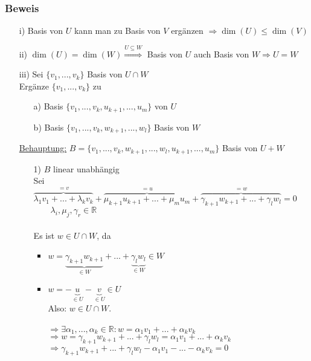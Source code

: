 \documentclass[12pt,titlepage, pdf]{article}
\newcommand{\R}{\mathds{R}}
\newcommand{\uline}[1]{\underline{#1}}
\renewcommand{\>}{\rightarrow}
\renewcommand{\*}{\cdot}
\begin{document}
	\subsubsection*{Beweis}
	\begin{itemize}
		\item[i)] Basis von $U$ kann man zu Basis von $V$ ergänzen $\Rightarrow \dim(U) \leq \dim(V)$
		\item[ii)] $\dim(U)= \dim(W) \overset{U\subseteq W}{\Rightarrow}$ Basis von $U$ auch Basis von $W \Rightarrow U = W$
		\item[iii)] Sei $\{v_1,...,v_k\}$ Basis von $U \cap W$ \\
		Ergänze $\{v_1,...,v_k\}$ zu 
		\begin{itemize}
			\item[a)] Basis $\{v_1,...,v_k, u_{k+1},...,u_m\}$ von $U$
			\item[b)] Basis $\{v_1,...,v_k,w_{k+1},...,w_l \}$ Basis von $W$
		\end{itemize}
		\uline{Behauptung:} $B = \{v_1,...,v_k,w_{k+1},...,w_l,u_{k+1},...,u_m\}$ Basis von $U+W$ \\
		\begin{itemize}
			\item[1)] $B$ linear unabhängig\\
			Sei\\
			$\overbrace{\lambda_1 v_1 + ...+ \lambda_k v_k}^{=v} + \overbrace{\mu_{k+1} u_{k+1} + ... + \mu_m u_m}^{=u} + \overbrace{\gamma_{k+1} w_{k+1} +... + \gamma_l w_l}^{=w} = 0$\\
			$ \qquad \lambda_i, \mu_j, \gamma_r \in \R$ \\
			\\
			Es ist $w \in U \cap W$, da
			\begin{itemize}
				\item $w = \underbrace{\gamma_{k+1} w_{k+1}}_{\in W} + ... + \underbrace{\gamma_l w_l}_{\in W} \in W $
				\item $w = -\underbrace{u}_{\in U}- \underbrace{v}_{\in U} \in U$ \\
				Also: $w \in U \cap W$.
				\\
				\\
				$\Rightarrow \exists \alpha_1,...,\alpha_k \in \R: w = \alpha_1 v_1 + ... + \alpha_k v_k$ \\
				$\Rightarrow w = \gamma_{k+1} w_{k+1} + ... + \gamma_l w_l = \alpha_1 v_1 + ... + \alpha_k v_k$ \\
				$\Rightarrow  \gamma_{k+1} w_{k+1} + ... + \gamma_l w_l - \alpha_1 v_1 - ... - \alpha_k v_k = 0$ \\

\end{itemize}
\end{itemize}
\end{itemize}
\end{document}
